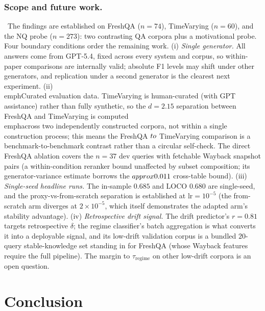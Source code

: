 \documentclass[pdflatex,sn-basic]{sn-jnl}
\begin{document}
\subsubsection*{Scope and future work.}~The findings are established on FreshQA ($n{=}74$), TimeVarying ($n{=}60$), and the NQ probe ($n{=}273$): two contrasting QA corpora plus a motivational probe. Four boundary conditions order the remaining work. (i) \emph{Single generator.} All answers come from GPT-5.4, fixed across every system and corpus, so within-paper comparisons are internally valid; absolute F1 levels may shift under other generators, and replication under a second generator is the clearest next experiment. (ii) \\emph{Curated evaluation data.} TimeVarying is human-curated (with GPT assistance) rather than fully synthetic, so the $d{=}2.15$ separation between FreshQA and TimeVarying is computed \\emph{across} two independently constructed corpora, not within a single construction process; this means the FreshQA $\\to$ TimeVarying comparison is a benchmark-to-benchmark contrast rather than a circular self-check. The direct FreshQA ablation covers the $n{=}37$ dev queries with fetchable Wayback snapshot pairs (a within-condition reranker bound unaffected by subset composition; its generator-variance estimate borrows the $\\approx 0.011$ cross-table bound). (iii) \emph{Single-seed headline runs.} The in-sample $0.685$ and LOCO $0.680$ are single-seed, and the proxy-vs-from-scratch separation is established at $\mathrm{lr}{=}10^{-5}$ (the from-scratch arm diverges at $2{\times}10^{-5}$, which itself demonstrates the adapted arm's stability advantage). (iv) \emph{Retrospective drift signal.} The drift predictor's $r{=}0.81$ targets retrospective $\delta$; the regime classifier's batch aggregation is what converts it into a deployable signal, and its low-drift validation corpus is a bundled $20$-query stable-knowledge set standing in for FreshQA (whose Wayback features require the full pipeline). The margin to $\tau_{\text{regime}}$ on other low-drift corpora is an open question.

\section{Conclusion}
\label{sec:conclusion}
\end{document}
